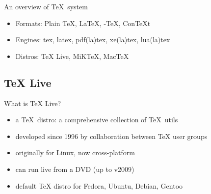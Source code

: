\documentclass{beamer}
\def\TeXLive{\TeX{} Live\xspace}
\let\TL=\TeXLive
\begin{document}
%

\begin{frame}{An overview of \TeX\ system}
  \begin{itemize}
    \item Formats: Plain \TeX, \LaTeX, \AmS-\TeX, Con\TeX{}t
    \item Engines: tex, latex, pdf(la)tex, xe(la)tex, lua(la)tex
      \pause
    \item Distros: \TL, MiKTeX, MacTeX
  \end{itemize}
\end{frame}

\subsection{\TeXLive}

\begin{frame}{What is \TL ?}
  \begin{itemize}
    \item a \TeX\ distro: a comprehensive collection of \TeX\ utils
    \item developed since 1996 by collaboration between TeX user groups
    \item originally for Linux, now cross-platform
    \item can run live from a DVD (up to v2009)
    \item default TeX distro for Fedora, Ubuntu, Debian, Gentoo
  \end{itemize}
\end{frame}
\end{document}
